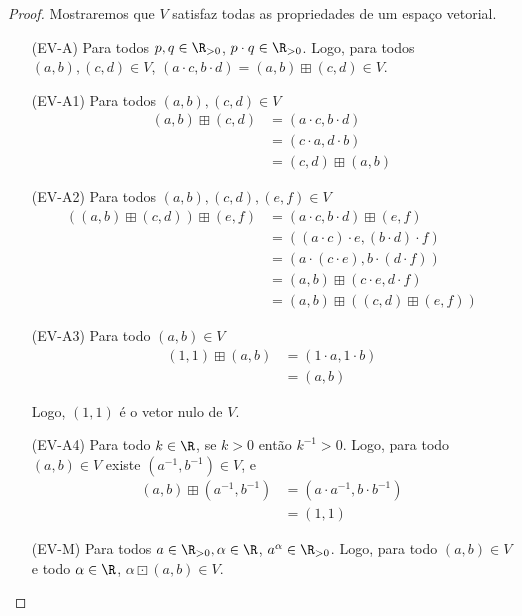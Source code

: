 \begin{proof} Mostraremos que $V$ satisfaz todas as propriedades de um espaço vetorial.
\begin{itemize}
\item [(EV-A)] Para todos $p, q \in \R_{>0}$, $p \cdot q \in \R_{>0}$. Logo, para todos
$(a, b), (c, d) \in V$, $(a \cdot c, b \cdot d) = (a, b) \boxplus (c, d) \in V$.

\item [(EV-A1)] Para todos $(a, b), (c, d) \in V$
\begin{align*}
 (a, b) \boxplus (c, d) &= (a\cdot c, b\cdot d) \tag{A} \\
 &= (c\cdot a, d\cdot b) \\
 &= (c, d) \boxplus (a, b) \tag{A}
\end{align*}

\item [(EV-A2)] Para todos $(a, b), (c, d), (e, f) \in V$
\begin{align*}
((a, b) \boxplus (c, d)) \boxplus (e, f) &= (a \cdot c, b\cdot d) \boxplus (e, f) \tag{A}\\
 &= ((a \cdot c) \cdot e, (b\cdot d) \cdot f) \\
 &= (a \cdot (c \cdot e), b\cdot (d \cdot f)) \\
 &= (a, b) \boxplus (c\cdot e, d\cdot f) \tag{A} \\
 &= (a, b) \boxplus ((c, d) \boxplus (e, f)) \tag{A}
\end{align*}

\item [(EV-A3)] Para todo $(a, b) \in V$
\begin{align*}
 (1, 1) \boxplus (a, b) &= (1 \cdot a, 1\cdot b) \tag{A}\\
 &= (a, b)
\end{align*}

Logo, $(1, 1)$ é o vetor nulo de $V$.

\item [(EV-A4)] Para todo $k \in \R$, se $k > 0$ então $k^{-1} > 0$. Logo, para todo $(a, b) \in V$ existe $(a^{-1}, b^{-1}) \in V$, e
\begin{align*}
 (a, b) \boxplus (a^{-1}, b^{-1}) &= (a \cdot a^{-1}, b\cdot b^{-1}) \tag{A} \\
 &= (1, 1)
\end{align*}
 
\item [(EV-M)] Para todos $a \in \R_{>0}, \alpha \in \R$, $a^\alpha \in \R_{>0}$. Logo, 
para todo $(a, b) \in V$ e todo $\alpha \in \R$, $\alpha \boxdot (a, b) \in V$.


\end{itemize}
\end{proof}
